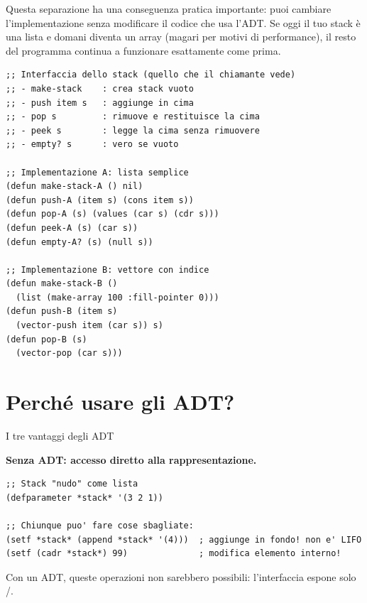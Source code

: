 Questa separazione ha una conseguenza pratica importante:
puoi cambiare l'implementazione senza modificare il codice che
usa l'ADT. Se oggi il tuo stack è una lista e domani diventa
un array (magari per motivi di performance), il resto del programma
continua a funzionare esattamente come prima.

\begin{esempio}
\begin{lstlisting}
;; Interfaccia dello stack (quello che il chiamante vede)
;; - make-stack    : crea stack vuoto
;; - push item s   : aggiunge in cima
;; - pop s         : rimuove e restituisce la cima
;; - peek s        : legge la cima senza rimuovere
;; - empty? s      : vero se vuoto

;; Implementazione A: lista semplice
(defun make-stack-A () nil)
(defun push-A (item s) (cons item s))
(defun pop-A (s) (values (car s) (cdr s)))
(defun peek-A (s) (car s))
(defun empty-A? (s) (null s))

;; Implementazione B: vettore con indice
(defun make-stack-B ()
  (list (make-array 100 :fill-pointer 0)))
(defun push-B (item s)
  (vector-push item (car s)) s)
(defun pop-B (s)
  (vector-pop (car s)))
\end{lstlisting}

\end{esempio}

\section{Perché usare gli ADT?}

\begin{concetto}{I tre vantaggi degli ADT}
\end{concetto}

\begin{attenzione}
\textbf{Senza ADT: accesso diretto alla rappresentazione.}

\begin{lstlisting}
;; Stack "nudo" come lista
(defparameter *stack* '(3 2 1))

;; Chiunque puo' fare cose sbagliate:
(setf *stack* (append *stack* '(4)))  ; aggiunge in fondo! non e' LIFO
(setf (cadr *stack*) 99)              ; modifica elemento interno!
\end{lstlisting}

Con un ADT, queste operazioni non sarebbero possibili:
l'interfaccia espone solo /.
\end{attenzione}

